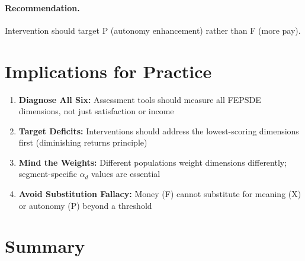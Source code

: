 \paragraph{Recommendation.}
Intervention should target P (autonomy enhancement) rather than F (more pay).


\section{Implications for Practice}
\label{sec:what-practice}

\begin{tcolorbox}[colback=green!5!white, colframe=green!75!black,
    title=Practical Implications]
\begin{enumerate}
\item \textbf{Diagnose All Six:} Assessment tools should measure all FEPSDE
      dimensions, not just satisfaction or income
\item \textbf{Target Deficits:} Interventions should address the lowest-scoring
      dimensions first (diminishing returns principle)
\item \textbf{Mind the Weights:} Different populations weight dimensions differently;
      segment-specific $\alpha_d$ values are essential
\item \textbf{Avoid Substitution Fallacy:} Money (F) cannot substitute for
      meaning (X) or autonomy (P) beyond a threshold
\end{enumerate}
\end{tcolorbox}


\section{Summary}
\label{sec:what-summary}

